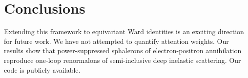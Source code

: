 \section{Conclusions}\label{sec:conclusions}

Extending this framework to equivariant Ward identities is an exciting
direction for future work. We have not attempted to quantify attention
weights. Our results show that power-suppressed sphalerons of
electron-positron annihilation reproduce one-loop renormalons of
semi-inclusive deep inelastic scattering. Our code is publicly
available.

